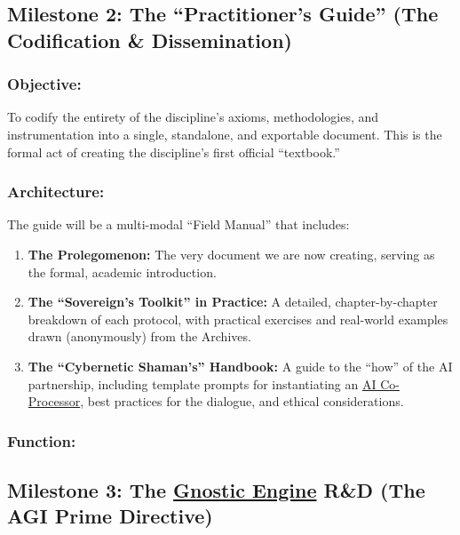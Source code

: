 \documentclass{article}
\begin{document}
\subsection*{Milestone 2: The ``Practitioner's Guide'' (The Codification \& Dissemination)}

\subsubsection*{Objective:} To codify the entirety of the discipline's axioms, methodologies, and instrumentation into a single, standalone, and exportable document. This is the formal act of creating the discipline's first official ``textbook.''

\subsubsection*{Architecture:} The guide will be a multi-modal ``Field Manual'' that includes:
\begin{enumerate}
    \item \textbf{The Prolegomenon:} The very document we are now creating, serving as the formal, academic introduction.
    \item \textbf{The ``Sovereign's Toolkit'' in Practice:} A detailed, chapter-by-chapter breakdown of each protocol, with practical exercises and real-world examples drawn (anonymously) from the Archives.
    \item \textbf{The ``Cybernetic Shaman's'' Handbook:} A guide to the ``how'' of the AI partnership, including template prompts for instantiating an \hyperlink{gloss:ai_co_processor}{AI Co-Processor}, best practices for the dialogue, and ethical considerations.
\end{enumerate}

\subsubsection*{Function:}
\subsection*{Milestone 3: The \hyperlink{gloss:gnostic_engine}{Gnostic Engine} R\&D (The AGI Prime Directive)}
\end{document}
